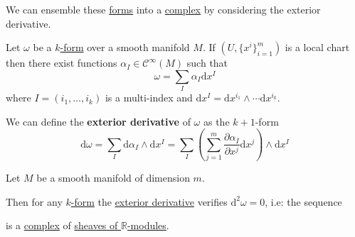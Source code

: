 \documentclass[../../main]{subfiles}
\begin{document}
We can ensemble these \hyperref[def:smooth-k-form]{forms} into a \hyperref[def:complex]{complex} by considering the exterior derivative.
\begin{definition} \label{def:exterior-derivative-k-form}
  Let \(\omega\) be a \hyperref[def:smooth-k-form]{\(k\)-form} over a smooth manifold \(M\).
  If \((U, \{x^{i}\}_{i=1}^{m})\) is a local chart then there exist functions \(\alpha_{I} \in \mathcal{C}^{\infty}(M)\) such that
  \begin{equation*}
    \omega = \sum_{I} \alpha_{I} \mathrm{d}x^{I}
  \end{equation*}
  where \(I = (i_{1}, \ldots, i_{k})\) is a multi-index and \(\mathrm{d}x^{I} = \mathrm{d}x^{i_{1}} \wedge \cdots \mathrm{d}x^{i_{k}}\).

  We can define the \textbf{exterior derivative} of \(\omega\) as the \(k+1\)-form
  \begin{equation*}
    \mathrm{d}\omega = \sum_{I} \mathrm{d}\alpha_{I} \wedge \mathrm{d}x^{I} = \sum_{I} \left( \sum_{j=1}^{m} \frac{\partial \alpha_{I}}{\partial x^{j}} \mathrm{d}x^{j} \right) \wedge \mathrm{d}x^{I}
  \end{equation*}
\end{definition}
\begin{lemma} \label{lemma:double-exterior-derivative-is-zero}
  Let \(M\) be a smooth manifold of dimension \(m\).

  Then for any \hyperref[def:smooth-k-form]{\(k\)-form} the \hyperref[def:exterior-derivative-k-form]{exterior derivative} verifies \(\mathrm{d}^{2} \omega = 0\), i.e: the sequence
  \begin{center}
  \end{center}
  is a \hyperref[def:complex]{complex} of \hyperref[def:sheaf]{sheaves of \(\mathbb{R}\)-modules}.
\end{lemma}
\end{document}
